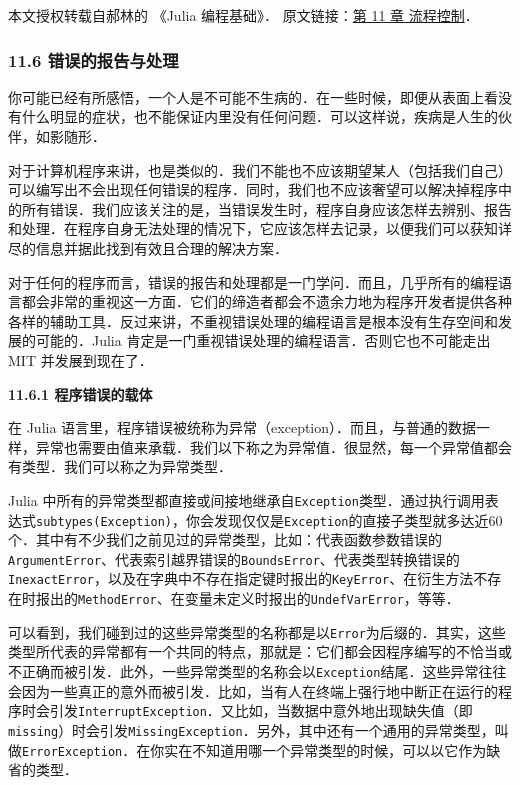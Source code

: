 
本文授权转载自郝林的 《Julia 编程基础》． 原文链接：\href{https://github.com/hyper0x/JuliaBasics/blob/master/book/ch11.md}{第 11 章 流程控制}．


\subsubsection{11.6 错误的报告与处理}

你可能已经有所感悟，一个人是不可能不生病的．在一些时候，即便从表面上看没有什么明显的症状，也不能保证内里没有任何问题．可以这样说，疾病是人生的伙伴，如影随形．

对于计算机程序来讲，也是类似的．我们不能也不应该期望某人（包括我们自己）可以编写出不会出现任何错误的程序．同时，我们也不应该奢望可以解决掉程序中的所有错误．我们应该关注的是，当错误发生时，程序自身应该怎样去辨别、报告和处理．在程序自身无法处理的情况下，它应该怎样去记录，以便我们可以获知详尽的信息并据此找到有效且合理的解决方案．

对于任何的程序而言，错误的报告和处理都是一门学问．而且，几乎所有的编程语言都会非常的重视这一方面．它们的缔造者都会不遗余力地为程序开发者提供各种各样的辅助工具．反过来讲，不重视错误处理的编程语言是根本没有生存空间和发展的可能的．Julia 肯定是一门重视错误处理的编程语言．否则它也不可能走出 MIT 并发展到现在了．

\textbf{11.6.1 程序错误的载体}

在 Julia 语言里，程序错误被统称为异常（exception）．而且，与普通的数据一样，异常也需要由值来承载．我们以下称之为异常值．很显然，每一个异常值都会有类型．我们可以称之为异常类型．

Julia 中所有的异常类型都直接或间接地继承自\verb|Exception|类型．通过执行调用表达式\verb|subtypes(Exception)|，你会发现仅仅是\verb|Exception|的直接子类型就多达近60个．其中有不少我们之前见过的异常类型，比如：代表函数参数错误的\verb|ArgumentError|、代表索引越界错误的\verb|BoundsError|、代表类型转换错误的\verb|InexactError|，以及在字典中不存在指定键时报出的\verb|KeyError|、在衍生方法不存在时报出的\verb|MethodError|、在变量未定义时报出的\verb|UndefVarError|，等等．

可以看到，我们碰到过的这些异常类型的名称都是以\verb|Error|为后缀的．其实，这些类型所代表的异常都有一个共同的特点，那就是：它们都会因程序编写的不恰当或不正确而被引发．此外，一些异常类型的名称会以\verb|Exception|结尾．这些异常往往会因为一些真正的意外而被引发．比如，当有人在终端上强行地中断正在运行的程序时会引发\verb|InterruptException|．又比如，当数据中意外地出现缺失值（即\verb|missing|）时会引发\verb|MissingException|．另外，其中还有一个通用的异常类型，叫做\verb|ErrorException|．在你实在不知道用哪一个异常类型的时候，可以以它作为缺省的类型．

